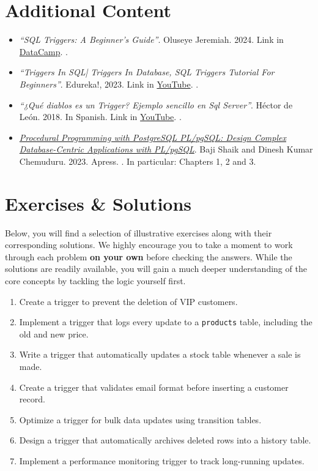 \documentclass{article}
\begin{document}
\section{Additional Content}

\begin{itemize}
    \item \textit{``SQL Triggers: A Beginner's Guide''}. Oluseye Jeremiah. 2024. Link in  \href{https://www.datacamp.com/tutorial/sql-triggers}{DataCamp}. \cite{datacamp_sql_triggers}.
    \item \textit{``Triggers In SQL| Triggers In Database, SQL Triggers Tutorial For Beginners''}. Edureka!, 2023. Link in \href{https://www.youtube.com/watch?v=MhsL8ke7IJY}{YouTube}. \cite{edureka_sql_triggers}.
    \item \textit{``¿Qué diablos es un Trigger? Ejemplo sencillo en Sql Server''}. Héctor de León. 2018. In Spanish. Link in  \href{https://www.youtube.com/watch?v=uTx7xd4ojkk}{YouTube}. \cite{hdeleon_trigger_sqlserver}.
    \item \href{https://link.springer.com/book/10.1007/978-1-4842-9840-4}{\textit{Procedural Programming with PostgreSQL PL/pgSQL: Design Complex Database-Centric Applications with PL/pgSQL}}.  Baji Shaik and Dinesh Kumar Chemuduru. 2023. Apress. \cite{Shaik2023Procedural}.  In particular: Chapters 1, 2 and 3.
\end{itemize}

\section{Exercises \& Solutions}
Below, you will find a selection of illustrative exercises along with their corresponding solutions. We highly encourage you to take a moment to work through each problem \textbf{on your own} before checking the answers. While the solutions are readily available, you will gain a much deeper understanding of the core concepts by tackling the logic yourself first.

\begin{enumerate}
    \item Create a trigger to prevent the deletion of VIP customers.
    \item Implement a trigger that logs every update to a \texttt{products} table, including the old and new price.
    \item Write a trigger that automatically updates a stock table whenever a sale is made.
    \item Create a trigger that validates email format before inserting a customer record.
    \item Optimize a trigger for bulk data updates using transition tables.
    \item Design a trigger that automatically archives deleted rows into a history table.
    \item Implement a performance monitoring trigger to track long-running updates.
\end{enumerate}
\end{document}
